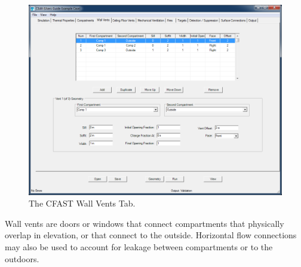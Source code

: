 \begin{figure}[h!]
\begin{center}
\includegraphics[width=6.5in]{FIGURES/Natural_Flow_Tab}
\caption[The CFAST Wall Vents Tab]{The CFAST Wall Vents Tab.}
\end{center}
\end{figure}

Wall vents are doors or windows that connect compartments that physically overlap in elevation, or that connect to the outside. Horizontal flow connections may also be used to account for leakage between compartments or to the outdoors.

